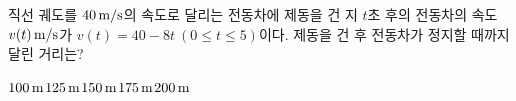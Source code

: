직선 궤도를 $40\mkern3mu \mathrm{m/s}$의 속도로 달리는 전동차에 제동을 건 지 $t$초 후의 전동차의 속도 $v(t)\mkern3mu \mathrm{m/s}$가 $v(t)=40-8t\ (0\le t\le 5)$이다. 제동을 건 후 전동차가 정지할 때까지 달린 거리는?
\begin{choices32}{$100\mkern3mu \mathrm{m}$}{$125\mkern3mu \mathrm{m}$}{$150\mkern3mu \mathrm{m}$}{$175\mkern3mu \mathrm{m}$}{$200\mkern3mu \mathrm{m}$}\end{choices32}
